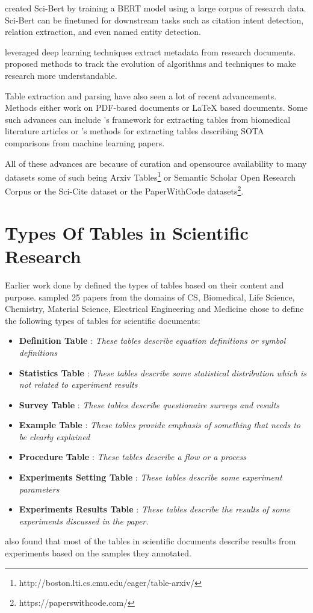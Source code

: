 \cite{beltagy2019scibert} created Sci-Bert by training a BERT model \parencite{devlin2018bert} using a large corpus of research data. Sci-Bert can be finetuned for downstream tasks such as citation intent detection, relation extraction, and even named entity detection. 
 
\cite{safder2020deep} leveraged deep learning techniques extract metadata from research documents. \cite{zha2019mining} proposed methods to track the evolution of algorithms and techniques to make research more understandable. 

Table extraction and parsing have also seen a lot of recent advancements. Methods either work on PDF-based documents or LaTeX based documents.  Some such advances can include \cite{milosevic2019framework}'s framework for extracting tables from biomedical literature articles or \cite{kardas2020axcell}'s methods for extracting tables describing SOTA comparisons from machine learning papers. 

All of these advances are because of curation and opensource availability to many datasets some of such being Arxiv Tables\footnote{http://boston.lti.cs.cmu.edu/eager/table-arxiv/} or Semantic Scholar Open Research Corpus\parencite{ammar-etal-2018-construction} or the Sci-Cite dataset \parencite{cohan2019structural} or the PaperWithCode datasets\footnote{https://paperswithcode.com/}.


\section{Types Of Tables in Scientific Research}
\label{relatedwork:table-type}
Earlier work done by \cite{kim2012scientific} defined the types of tables based on their content and purpose. \cite{kim2012scientific} sampled 25 papers from the domains of CS, Biomedical, Life Science, Chemistry, Material Science, Electrical Engineering and Medicine chose to define the following types of tables for scientific documents:
\begin{itemize}
    \item \textbf{Definition Table} : \textit{These tables describe equation definitions or symbol definitions}
    \item \textbf{Statistics Table} : \textit{These tables describe some statistical distribution which is not related to experiment results}
    \item \textbf{Survey Table } : \textit{These tables describe questionaire surveys and results }
    \item \textbf{Example Table } : \textit{These tables provide emphasis of something that needs to be clearly explained }
    \item \textbf{Procedure Table} : \textit{These tables describe a flow or a process}
    \item \textbf{Experiments Setting Table } : \textit{These tables describe some experiment parameters}
    \item \textbf{Experiments Results Table } : \textit{These tables describe the results of some experiments discussed in the paper.}
\end{itemize}

\cite{kim2012scientific} also found that most of the tables in scientific documents describe results from experiments based on the samples they annotated. 



